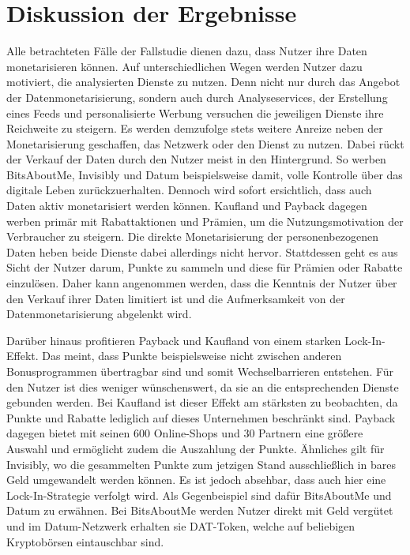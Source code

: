 \section{Diskussion der Ergebnisse}
Alle betrachteten Fälle der Fallstudie dienen dazu, dass Nutzer ihre Daten monetarisieren können. Auf unterschiedlichen Wegen werden Nutzer dazu motiviert, die analysierten Dienste zu nutzen. Denn nicht nur durch das Angebot der Datenmonetarisierung, sondern auch durch Analyseservices, der Erstellung eines Feeds und personalisierte Werbung versuchen die jeweiligen Dienste ihre Reichweite zu steigern. Es werden demzufolge stets weitere Anreize neben der Monetarisierung geschaffen, das Netzwerk oder den Dienst zu nutzen. Dabei rückt der Verkauf der Daten durch den Nutzer meist in den Hintergrund. So werben BitsAboutMe, Invisibly und Datum beispielsweise damit, volle Kontrolle über das digitale Leben zurückzuerhalten. Dennoch wird sofort ersichtlich, dass auch Daten aktiv monetarisiert werden können. Kaufland und Payback dagegen werben primär mit Rabattaktionen und Prämien, um die Nutzungsmotivation der Verbraucher zu steigern. Die direkte Monetarisierung der personenbezogenen Daten heben beide Dienste dabei allerdings nicht hervor. Stattdessen geht es aus Sicht der Nutzer darum, Punkte zu sammeln und diese für Prämien oder Rabatte einzulösen. Daher kann angenommen werden, dass die Kenntnis der Nutzer über den Verkauf ihrer Daten limitiert ist und die Aufmerksamkeit von der Datenmonetarisierung abgelenkt wird. \newline

\noindent Darüber hinaus profitieren Payback und Kaufland von einem starken Lock-In-Effekt. Das meint, dass Punkte beispielsweise nicht zwischen anderen Bonusprogrammen übertragbar sind und somit Wechselbarrieren entstehen. Für den Nutzer ist dies weniger wünschenswert, da sie an die entsprechenden Dienste gebunden werden. Bei Kaufland ist dieser Effekt am stärksten zu beobachten, da Punkte und Rabatte lediglich auf dieses Unternehmen beschränkt sind. Payback dagegen bietet mit seinen 600 Online-Shops und 30 Partnern eine größere Auswahl und ermöglicht zudem die Auszahlung der Punkte. Ähnliches gilt für Invisibly, wo die gesammelten Punkte zum jetzigen Stand ausschließlich in bares Geld umgewandelt werden können. Es ist jedoch absehbar, dass auch hier eine Lock-In-Strategie verfolgt wird. Als Gegenbeispiel sind dafür BitsAboutMe und Datum zu erwähnen. Bei BitsAboutMe werden Nutzer direkt mit Geld vergütet und im Datum-Netzwerk erhalten sie DAT-Token, welche auf beliebigen Kryptobörsen eintauschbar sind. \newline 

